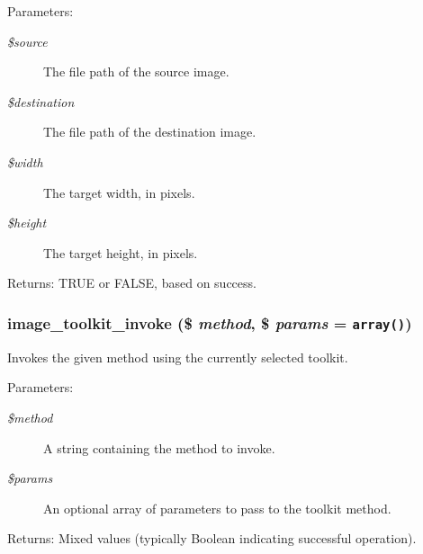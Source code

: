 \begin{Desc}
\item[Parameters:]
\begin{description}
\item[{\em \$source}]The file path of the source image. \item[{\em \$destination}]The file path of the destination image. \item[{\em \$width}]The target width, in pixels. \item[{\em \$height}]The target height, in pixels. \end{description}
\end{Desc}
\begin{Desc}
\item[Returns:]TRUE or FALSE, based on success. \end{Desc}
\hypertarget{group__image_g5429299fdb0dd86b5c8050dc1dba5aee}{
\subsubsection[{image\_\-toolkit\_\-invoke}]{\setlength{\rightskip}{0pt plus 5cm}image\_\-toolkit\_\-invoke (\$ {\em method}, \/  \$ {\em params} = {\tt array()})}}
\label{group__image_g5429299fdb0dd86b5c8050dc1dba5aee}


Invokes the given method using the currently selected toolkit.

\begin{Desc}
\item[Parameters:]
\begin{description}
\item[{\em \$method}]A string containing the method to invoke. \item[{\em \$params}]An optional array of parameters to pass to the toolkit method. \end{description}
\end{Desc}
\begin{Desc}
\item[Returns:]Mixed values (typically Boolean indicating successful operation). \end{Desc}
